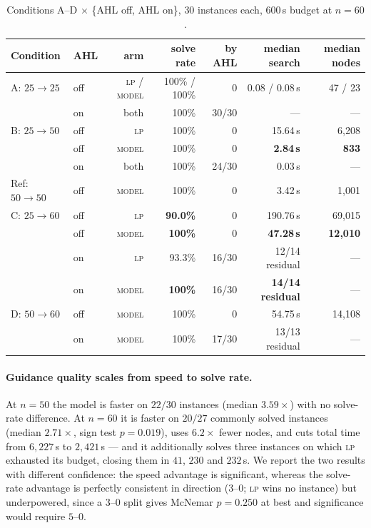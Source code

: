 \documentclass[12pt]{article}
\begin{document}
\begin{table}[h]
\centering
\begin{tabular}{llrrrrr}
\toprule
Condition & AHL & arm & solve rate & by AHL & median search & median nodes \\
\midrule
A: $25\!\to\!25$ & off & \textsc{lp} / \textsc{model} & 100\% / 100\% & 0 & 0.08 / 0.08\,s & 47 / 23 \\
 & on & both & 100\% & 30/30 & --- & --- \\
B: $25\!\to\!50$ & off & \textsc{lp} & 100\% & 0 & 15.64\,s & 6{,}208 \\
 & off & \textsc{model} & 100\% & 0 & \textbf{2.84\,s} & \textbf{833} \\
 & on & both & 100\% & 24/30 & 0.03\,s & --- \\
Ref: $50\!\to\!50$ & off & \textsc{model} & 100\% & 0 & 3.42\,s & 1{,}001 \\
\midrule
C: $25\!\to\!60$ & off & \textsc{lp} & \textbf{90.0\%} & 0 & 190.76\,s & 69{,}015 \\
 & off & \textsc{model} & \textbf{100\%} & 0 & \textbf{47.28\,s} & \textbf{12{,}010} \\
 & on & \textsc{lp} & 93.3\% & 16/30 & 12/14 residual & --- \\
 & on & \textsc{model} & \textbf{100\%} & 16/30 & \textbf{14/14 residual} & --- \\
D: $50\!\to\!60$ & off & \textsc{model} & 100\% & 0 & 54.75\,s & 14{,}108 \\
 & on & \textsc{model} & 100\% & 17/30 & 13/13 residual & --- \\
\bottomrule
\end{tabular}
\caption{Conditions A--D $\times$ \{AHL off, AHL on\}, $30$ instances each, 600\,s budget at $n=60$.}
\label{tab:transfer}
\end{table}

\paragraph{Guidance quality scales from speed to solve rate.} At $n=50$ the model is faster on $22/30$ instances (median $3.59\times$) with no solve-rate difference. At $n=60$ it is faster on $20/27$ commonly solved instances (median $2.71\times$, sign test $p=0.019$), uses $6.2\times$ fewer nodes, and cuts total time from $6{,}227$\,s to $2{,}421$\,s --- and it additionally solves three instances on which \textsc{lp} exhausted its budget, closing them in $41$, $230$ and $232$\,s. We report the two results with different confidence: the speed advantage is significant, whereas the solve-rate advantage is perfectly consistent in direction ($3$--$0$; \textsc{lp} wins no instance) but underpowered, since a $3$--$0$ split gives McNemar $p=0.250$ at best and significance would require $5$--$0$.
\end{document}
